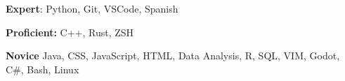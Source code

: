 \documentclass[../main.tex]{subfiles}
\begin{document}
 
 \textbf{Expert}: Python, Git, VSCode, Spanish

 \textbf{Proficient:} C++, Rust, ZSH

 \textbf{Novice} Java, CSS, JavaScript, HTML, Data Analysis, R, SQL, VIM, Godot, C\#, Bash, Linux
\end{document}

